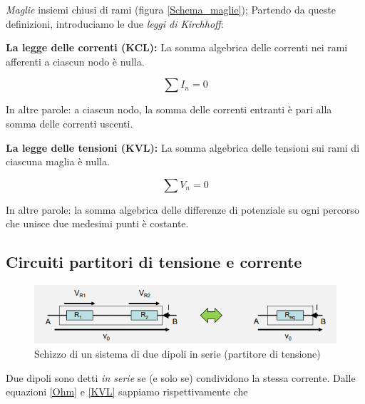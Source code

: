 \documentclass{article}
\begin{document}
\textit{Maglie} insiemi chiusi di rami (figura \ref{Schema_maglie});
\newpage
Partendo da queste definizioni, introduciamo le due \textit{leggi di Kirchhoff}:

\vspace{3mm}

\textbf{La legge delle correnti (KCL):} La somma algebrica delle correnti nei rami afferenti a ciascun nodo è nulla.

\begin{equation}
\sum I_n = 0
\label{KCL}
\end{equation}

In altre parole: a ciascun nodo, la somma delle correnti  entranti è pari alla somma delle correnti uscenti.

\vspace{3mm}

\textbf{La legge delle tensioni (KVL):} La somma algebrica delle tensioni sui rami di ciascuna maglia è nulla.

\begin{equation}
\sum V_n = 0
\label{KVL}
\end{equation}

In altre parole: la somma algebrica delle differenze di potenziale su ogni percorso che unisce due medesimi punti è costante.







\subsection{Circuiti partitori di tensione e corrente}

\begin{figure}[h]
  \centering
  \includegraphics[scale=0.7]{IM_circuiti_partitori}
  \caption{Schizzo di un sistema di due dipoli in serie (partitore di tensione)}
  \label{Schema_dipoli_serie}
\end{figure}

Due dipoli sono detti \textit{in serie} se (e solo se) condividono la stessa corrente. Dalle equazioni \ref{Ohm} e \ref{KVL} sappiamo rispettivamente che
\end{document}
